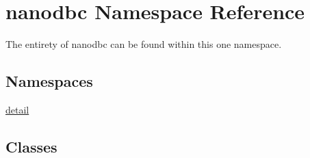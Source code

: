 \hypertarget{namespacenanodbc}{}\section{nanodbc Namespace Reference}
\label{namespacenanodbc}


The entirety of nanodbc can be found within this one namespace.  


\subsection*{Namespaces}
\begin{DoxyCompactItemize}
\item 
 \mbox{\hyperlink{namespacenanodbc_1_1detail}{detail}}
\end{DoxyCompactItemize}
\subsection*{Classes}
